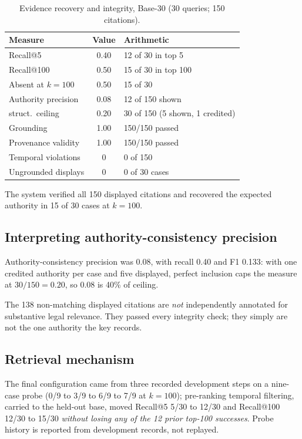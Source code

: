\documentclass[conference]{IEEEtran}
\begin{document}
\begin{table}[t]
\caption{Evidence recovery and integrity, Base-30 (30
queries; 150 citations).}
\label{tab:integrity}
\centering
\footnotesize
\setlength{\tabcolsep}{4pt}
\begin{tabular}{lcl}
\toprule
\textbf{Measure} & \textbf{Value} & \textbf{Arithmetic} \\
\midrule
Recall@5            & 0.40 & 12 of 30 in top 5 \\
Recall@100          & 0.50 & 15 of 30 in top 100 \\
Absent at $k{=}100$ & 0.50 & 15 of 30 \\
Authority precision & 0.08 & 12 of 150 shown \\
\quad struct.\ ceiling & 0.20 & 30 of 150 (5 shown, 1 credited) \\
Grounding           & 1.00 & 150/150 passed \\
Provenance validity & 1.00 & 150/150 passed \\
Temporal violations & 0    & 0 of 150 \\
Ungrounded displays  & 0    & 0 of 30 cases \\
\bottomrule
\end{tabular}
\end{table}



The system verified all 150 displayed citations and recovered the expected authority in 15 of 30 cases at $k{=}100$.

\subsection{Interpreting authority-consistency precision}
\label{sec:ceiling}

Authority-consistency precision was 0.08, with recall 0.40 and F1 0.133:
with one credited authority per case and five displayed, perfect inclusion caps
the measure at $30/150 = 0.20$, so 0.08 is 40\% of ceiling.

The 138 non-matching displayed citations are \emph{not} independently annotated
for substantive legal relevance. They passed
every integrity check; they simply are not the one authority the key records.

\subsection{Retrieval mechanism}

The final configuration came from three recorded development steps on a
nine-case probe (0/9 to 3/9 to 6/9 to 7/9 at $k{=}100$); pre-ranking temporal filtering,
carried to the held-out base, moved Recall@5 5/30 to 12/30 and Recall@100 12/30 to
15/30 \emph{without losing any of the 12 prior top-100 successes}. Probe history is
reported from development records, not replayed.
\end{document}
